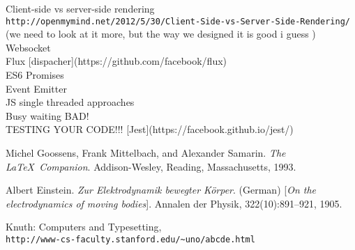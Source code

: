 \begin{thebibliography}{9}

Client-side vs server-side rendering
\\\texttt{http://openmymind.net/2012/5/30/Client-Side-vs-Server-Side-Rendering/}
\\ (we need to look at it more, but the way we designed it is good i guess )
\\ Websocket
\\ Flux [dispacher](https://github.com/facebook/flux)
\\ ES6 Promises
\\ Event Emitter
\\ JS single threaded approaches
\\ Busy waiting BAD!
\\ TESTING YOUR CODE!!! [Jest](https://facebook.github.io/jest/)

Michel Goossens, Frank Mittelbach, and Alexander Samarin. 
\textit{The \LaTeX\ Companion}. 
Addison-Wesley, Reading, Massachusetts, 1993.
 
Albert Einstein. 
\textit{Zur Elektrodynamik bewegter K{\"o}rper}. (German) 
[\textit{On the electrodynamics of moving bodies}]. 
Annalen der Physik, 322(10):891–921, 1905.
 
Knuth: Computers and Typesetting,
\\\texttt{http://www-cs-faculty.stanford.edu/\~{}uno/abcde.html}
\end{thebibliography}

